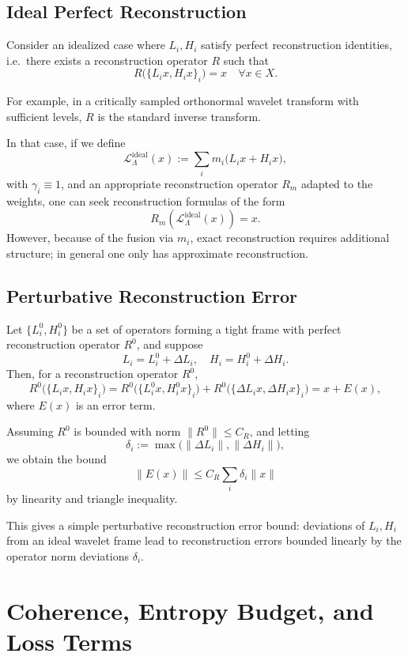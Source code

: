 \documentclass[11pt]{article}
\begin{document}
\subsection{Ideal Perfect Reconstruction}

Consider an idealized case where $L_i, H_i$ satisfy perfect reconstruction identities, i.e.\ there exists a reconstruction operator $R$ such that
\[
  R\bigl(\{L_i x,H_i x\}_i\bigr) = x \quad \forall x\in X.
\]

For example, in a critically sampled orthonormal wavelet transform with sufficient levels, $R$ is the standard inverse transform.

In that case, if we define
\[
  \mathcal{L}_\Lambda^{\mathrm{ideal}}(x) := \sum_i m_i \bigl(L_i x + H_i x\bigr),
\]
with $\gamma_i \equiv 1$, and an appropriate reconstruction operator $R_m$ adapted to the weights, one can seek reconstruction formulas of the form
\[
  R_m(\mathcal{L}_\Lambda^{\mathrm{ideal}}(x)) = x.
\]
However, because of the fusion via $m_i$, exact reconstruction requires additional structure; in general one only has approximate reconstruction.

\subsection{Perturbative Reconstruction Error}

Let $\{L_i^0, H_i^0\}$ be a set of operators forming a tight frame with perfect reconstruction operator $R^0$, and suppose
\[
  L_i = L_i^0 + \Delta L_i, \quad H_i = H_i^0 + \Delta H_i.
\]
Then, for a reconstruction operator $R^0$,
\[
  R^0\bigl(\{L_i x,H_i x\}_i\bigr)
  = R^0\bigl(\{L_i^0 x,H_i^0 x\}_i\bigr)
    + R^0\bigl(\{\Delta L_i x,\Delta H_i x\}_i\bigr)
  = x + E(x),
\]
where $E(x)$ is an error term.

Assuming $R^0$ is bounded with norm $\|R^0\|\le C_R$, and letting
\[
  \delta_i := \max\bigl(\|\Delta L_i\|,\|\Delta H_i\|\bigr),
\]
we obtain the bound
\[
  \|E(x)\|
  \le C_R \sum_i \delta_i \|x\|
\]
by linearity and triangle inequality.

This gives a simple perturbative reconstruction error bound: deviations of $L_i,H_i$ from an ideal wavelet frame lead to reconstruction errors bounded linearly by the operator norm deviations $\delta_i$.

\section{Coherence, Entropy Budget, and Loss Terms}
\end{document}
